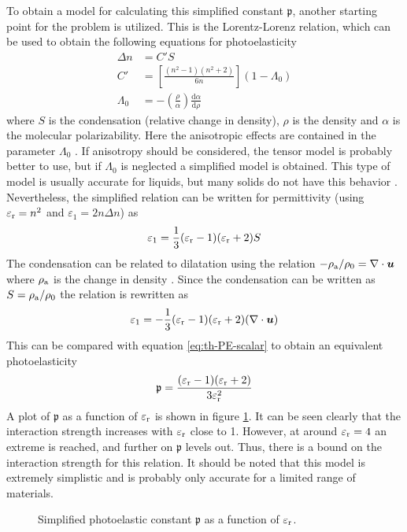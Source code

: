 \documentclass[11pt,twoside]{eitExjobb}
\begin{document}
	To obtain a model for calculating this simplified constant $\mathfrak{p}$, another starting point for the problem is utilized. This is the Lorentz-Lorenz relation, which can be used to obtain the following equations for photoelasticity \cite{Korpel1988}
	\begin{align*}
		\Delta n &= C' S \\
		C' &= \left[ \frac{(n^2-1)(n^2+2)}{6n} \right](1-\Lambda_0) \\
		\Lambda_0 &= -\left( \frac{\rho}{\alpha} \right) \frac{\mathrm{d} \alpha}{\mathrm{d} \rho}
	\end{align*}
	where $S$ is the condensation (relative change in density), $\rho$ is the density and $\alpha$ is the molecular polarizability. Here the anisotropic effects are contained in the parameter $\Lambda_0$ \cite{Korpel1988}. If anisotropy should be considered, the tensor model is probably better to use, but if $\Lambda_0$ is neglected a simplified model is obtained. This type of model is usually accurate for liquids, but many solids do not have this behavior \cite{Korpel1988}. Nevertheless, the simplified relation can be written for permittivity (using $\varepsilon_{\mathrm{r}} = n^2$ and $\varepsilon_1 = 2n \Delta n$) as
	\begin{equation*}
		\varepsilon_1 = \frac{1}{3} (\varepsilon_{\mathrm{r}} - 1)(\varepsilon_{\mathrm{r}} + 2) S
	\end{equation*}
	The condensation can be related to dilatation using the relation $-\rho_{\mathrm{a}}/\rho_0 = \nabla \cdot \bm{u}$ where $\rho_{\mathrm{a}}$ is the change in density \cite{Kaufman2000}. Since the condensation can be written as $S = \rho_{\mathrm{a}}/\rho_0$ \cite{Korpel1988} the relation is rewritten as
	\begin{equation*}
		\varepsilon_1 = -\frac{1}{3} (\varepsilon_{\mathrm{r}} - 1)(\varepsilon_{\mathrm{r}} + 2) (\nabla \cdot \bm{u})
	\end{equation*}
	This can be compared with equation \eqref{eq:th-PE-scalar} to obtain an equivalent photoelasticity
	\begin{equation}
		\mathfrak{p} = \frac{(\varepsilon_{\mathrm{r}} - 1)(\varepsilon_{\mathrm{r}} + 2)}{3\varepsilon_{\mathrm{r}}^2}
		\label{eq:th-PE-liquid-model}
	\end{equation}
	A plot of $\mathfrak{p}$ as a function of $\varepsilon_{\mathrm{r}}$ is shown in figure \ref{fig:photoelastic-liquid}. It can be seen clearly that the interaction strength increases with $\varepsilon_{\mathrm{r}}$ close to 1. However, at around $\varepsilon_{\mathrm{r}} = 4$ an extreme is reached, and further on $\mathfrak{p}$ levels out. Thus, there is a bound on the interaction strength for this relation. It should be noted that this model is extremely simplistic and is probably only accurate for a limited range of materials.
	\begin{figure}[h]
		\centering
		\resizebox{\textwidth}{!}{
			
		}
		\caption{\label{fig:photoelastic-liquid} Simplified photoelastic constant $\mathfrak{p}$ as a function of $\varepsilon_{\mathrm{r}}$.}
	\end{figure}
	
\end{document}

